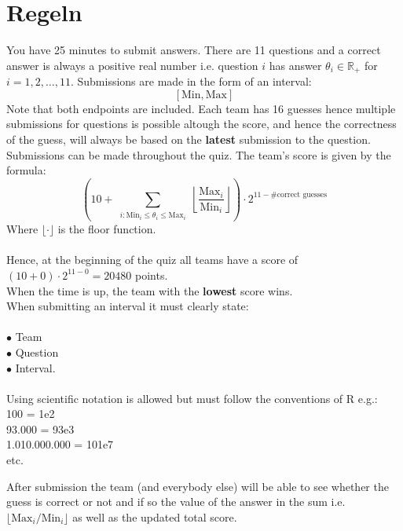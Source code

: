 \documentclass[12pt,a4paper]{article}
\begin{document}
 
\section*{Regeln}
You have 25 minutes to submit answers. There are 11 questions and a correct answer is always a positive real number i.e. question $i$ has answer $\theta_i \in \mathbb{R}_+$ for $i = 1,2,\ldots,11$. Submissions are made in the form of an interval:
$$
[\text{Min}, \text{Max}]
$$
Note that both endpoints are included. Each team has 16 guesses hence multiple submissions for questions is possible altough the score, and hence the correctness of the guess, will always be based on the \textbf{latest} submission to the question.
Submissions can be made throughout the quiz. 
The team's score is given by the formula:
$$
\left( 10 + \sum_{\substack{i : \text{Min}_i \leq \theta_i \leq \text{Max}_i}} \left\lfloor \frac{\text{Max}_i}{\text{Min}_i} \right\rfloor \right) \cdot 2^{11 - \# \text{correct guesses} }
$$
Where $\lfloor \cdot \rfloor$ is the floor function.\\ \\
Hence, at the beginning of the quiz all teams have a score of
$(10 + 0)\cdot 2^{11-0} = 20480$ points. \\
When the time is up, the team with the \textbf{lowest} score wins.\\
When submitting an interval it must clearly state:\\ \\
$\bullet$ Team\\
$\bullet$ Question\\
$\bullet$ Interval. \\ \\
Using scientific notation is allowed but must follow the conventions of R e.g.:\\
100 = 1e2 \\
93.000 = 93e3 \\
1.010.000.000 = 101e7 \\
etc.

After submission the team (and everybody else) will be able to see whether the guess is correct or not and if so the value of the answer in the sum i.e. $\lfloor \text{Max}_i / \text{Min}_i \rfloor$ as well as the updated total score.

\newpage
\end{document}
